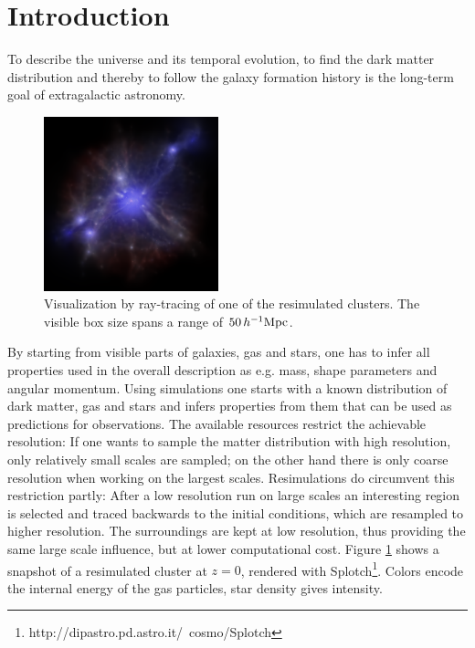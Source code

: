 \documentclass[useAMS,usenatbib]{mn2e}
\begin{document}
\section{Introduction}
\label{chap:intro}
%
%
To describe the universe and its temporal evolution, to find the dark matter
distribution and thereby to follow the galaxy formation history is the
long-term goal of extragalactic astronomy.
%
%
\begin{figure}
  \begin{center}
    \includegraphics[width=0.45\textwidth]{fig/splotch/out.eps}
  \end{center}
  \caption{ \label{fig:splotch} Visualization by ray-tracing of one of the
    resimulated clusters. The visible box size spans a range of $50\,h^{-1}{\rm
      Mpc}$.}
\end{figure}
%
%
By starting from visible parts of galaxies, gas and stars, one has to infer
all properties used in the overall description as e.g. mass, shape parameters
and angular momentum. Using simulations one starts with a known distribution
of dark matter, gas and stars and infers properties from them that can be used
as predictions for observations.
The available resources restrict the achievable resolution: If one wants to
sample the matter distribution with high resolution, only relatively small
scales are sampled; on the other hand there is only coarse resolution when
working on the largest scales.
Resimulations do circumvent this restriction partly: After a low resolution
run on large scales an interesting region is selected and traced backwards to
the initial conditions, which are resampled to higher resolution. The
surroundings are kept at low resolution, thus providing the same large scale
influence, but at lower computational cost. Figure \ref{fig:splotch} shows a
snapshot of a resimulated cluster at $z=0$, rendered with {\sc
  Splotch}\footnote{http://dipastro.pd.astro.it/~cosmo/Splotch}. Colors encode
the internal energy of the gas particles, star density gives intensity.
\end{document}
